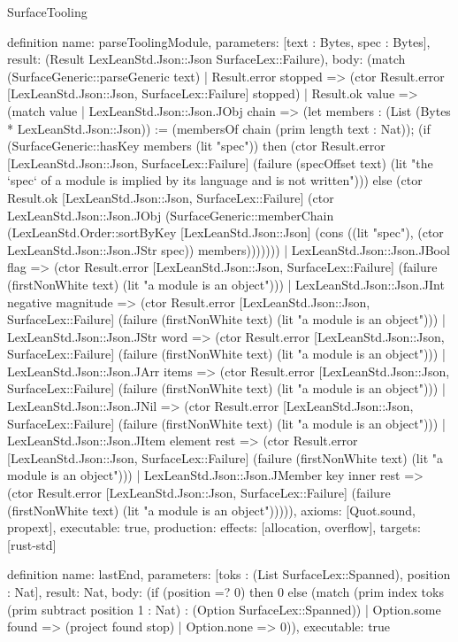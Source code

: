 \begin{lexlean}{SurfaceTooling}
\begin{semanticmodule}
definition{
  name: parseToolingModule,
  parameters: [text : Bytes, spec : Bytes],
  result: (Result LexLeanStd.Json::Json SurfaceLex::Failure),
  body: (match (SurfaceGeneric::parseGeneric text)
    | Result.error stopped => (ctor Result.error [LexLeanStd.Json::Json, SurfaceLex::Failure] stopped)
    | Result.ok value => (match value
      | LexLeanStd.Json::Json.JObj chain => (let members : (List (Bytes * LexLeanStd.Json::Json)) := (membersOf chain (prim length text : Nat)); (if (SurfaceGeneric::hasKey members (lit "spec")) then (ctor Result.error [LexLeanStd.Json::Json, SurfaceLex::Failure] (failure (specOffset text) (lit "the `spec` of a module is implied by its language and is not written"))) else (ctor Result.ok [LexLeanStd.Json::Json, SurfaceLex::Failure] (ctor LexLeanStd.Json::Json.JObj (SurfaceGeneric::memberChain (LexLeanStd.Order::sortByKey [LexLeanStd.Json::Json] (cons ((lit "spec"), (ctor LexLeanStd.Json::Json.JStr spec)) members)))))))
      | LexLeanStd.Json::Json.JBool flag => (ctor Result.error [LexLeanStd.Json::Json, SurfaceLex::Failure] (failure (firstNonWhite text) (lit "a module is an object")))
      | LexLeanStd.Json::Json.JInt negative magnitude => (ctor Result.error [LexLeanStd.Json::Json, SurfaceLex::Failure] (failure (firstNonWhite text) (lit "a module is an object")))
      | LexLeanStd.Json::Json.JStr word => (ctor Result.error [LexLeanStd.Json::Json, SurfaceLex::Failure] (failure (firstNonWhite text) (lit "a module is an object")))
      | LexLeanStd.Json::Json.JArr items => (ctor Result.error [LexLeanStd.Json::Json, SurfaceLex::Failure] (failure (firstNonWhite text) (lit "a module is an object")))
      | LexLeanStd.Json::Json.JNil => (ctor Result.error [LexLeanStd.Json::Json, SurfaceLex::Failure] (failure (firstNonWhite text) (lit "a module is an object")))
      | LexLeanStd.Json::Json.JItem element rest => (ctor Result.error [LexLeanStd.Json::Json, SurfaceLex::Failure] (failure (firstNonWhite text) (lit "a module is an object")))
      | LexLeanStd.Json::Json.JMember key inner rest => (ctor Result.error [LexLeanStd.Json::Json, SurfaceLex::Failure] (failure (firstNonWhite text) (lit "a module is an object"))))),
  axioms: [Quot.sound, propext],
  executable: true,
  production: {effects: [allocation, overflow], targets: [rust-std]}
}

definition{
  name: lastEnd,
  parameters: [toks : (List SurfaceLex::Spanned), position : Nat],
  result: Nat,
  body: (if (position =? 0) then 0 else (match (prim index toks (prim subtract position 1 : Nat) : (Option SurfaceLex::Spanned))
    | Option.some found => (project found stop)
    | Option.none => 0)),
  executable: true
}


\end{semanticmodule}
\end{lexlean}
